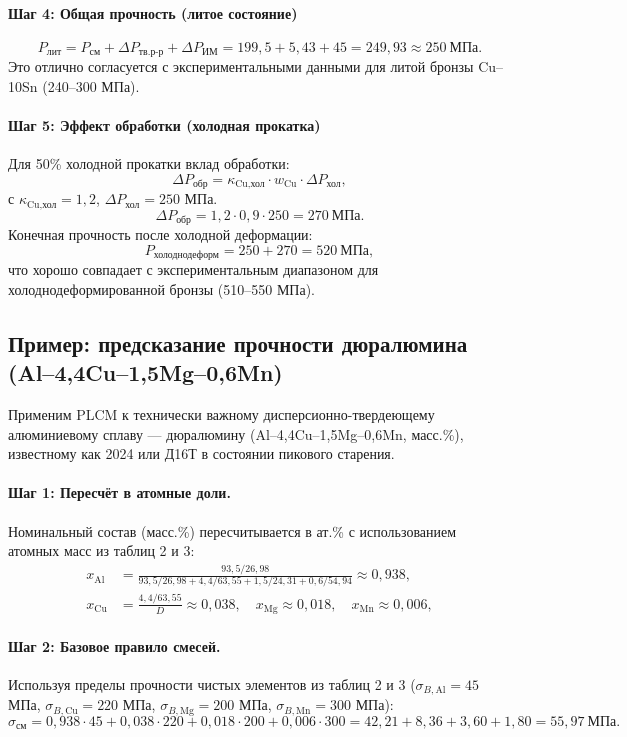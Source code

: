 \documentclass[12pt,a4paper]{article}
\begin{document}
	\paragraph{Шаг 4: Общая прочность (литое состояние)}
	\[
	P_{\text{лит}} = P_{\text{см}} + \Delta P_{\text{тв.р-р}} + \Delta P_{\text{ИМ}} = 199,5 + 5,43 + 45 = 249,93 \approx 250\ \text{МПа}.
	\]
	Это отлично согласуется с экспериментальными данными для литой бронзы Cu–10Sn (240–300 МПа).
	
	\paragraph{Шаг 5: Эффект обработки (холодная прокатка)}
	Для 50\% холодной прокатки вклад обработки:
	\[
	\Delta P_{\text{обр}} = \kappa_{\text{Cu,хол}} \cdot w_{\text{Cu}} \cdot \Delta P_{\text{хол}},
	\]
	с \(\kappa_{\text{Cu,хол}} = 1,2\), \(\Delta P_{\text{хол}} = 250\) МПа.
	\[
	\Delta P_{\text{обр}} = 1,2 \cdot 0,9 \cdot 250 = 270\ \text{МПа}.
	\]
	Конечная прочность после холодной деформации:
	\[
	P_{\text{холоднодеформ}} = 250 + 270 = 520\ \text{МПа},
	\]
	что хорошо совпадает с экспериментальным диапазоном для холоднодеформированной бронзы (510–550 МПа).
	
	\subsection{Пример: предсказание прочности дюралюмина (Al–4,4Cu–1,5Mg–0,6Mn)}
	\label{subsec:example-duralumin}
	
	Применим PLCM к технически важному дисперсионно-твердеющему алюминиевому сплаву — дюралюмину (Al–4,4Cu–1,5Mg–0,6Mn, масс.\%), известному как 2024 или Д16Т в состоянии пикового старения.
	
	\paragraph{Шаг 1: Пересчёт в атомные доли.}
	Номинальный состав (масс.\%) пересчитывается в ат.\% с использованием атомных масс из таблиц 2 и 3:
	\[
	\begin{aligned}
		x_{\mathrm{Al}} &= \frac{93,5/26,98}{93,5/26,98+4,4/63,55+1,5/24,31+0,6/54,94} \approx 0,938,\\
		x_{\mathrm{Cu}} &= \frac{4,4/63,55}{D} \approx 0,038,\quad
		x_{\mathrm{Mg}} \approx 0,018,\quad
		x_{\mathrm{Mn}} \approx 0,006,
	\end{aligned}
	\]
	
	\paragraph{Шаг 2: Базовое правило смесей.}
	Используя пределы прочности чистых элементов из таблиц 2 и 3 (\(\sigma_{B,\mathrm{Al}}=45\) МПа, \(\sigma_{B,\mathrm{Cu}}=220\) МПа, \(\sigma_{B,\mathrm{Mg}}=200\) МПа, \(\sigma_{B,\mathrm{Mn}}=300\) МПа):
	\[
	\sigma_{\mathrm{см}} = 0,938\cdot45 + 0,038\cdot220 + 0,018\cdot200 + 0,006\cdot300
	= 42,21 + 8,36 + 3,60 + 1,80 = 55,97\ \text{МПа}.
	\]
	
\end{document}

